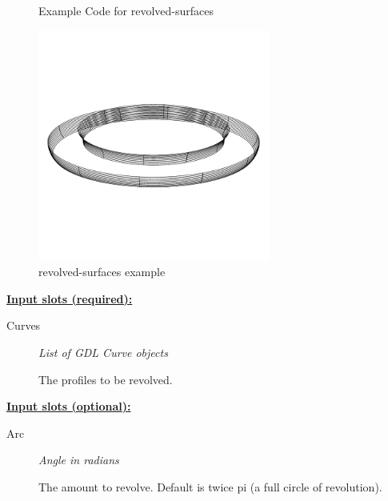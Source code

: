 \documentclass [11pt]{book}
\begin{document}
\begin{itemize}
\begin{figure}
\caption{Example Code for revolved-surfaces}

\label{fig:example-code-revolved-surfaces}

\end{figure}

\begin{figure}
\begin{center}
\includegraphics[width=3in,height=3in]{../images/example-revolved-surfaces.pdf}
\end{center}

\caption{revolved-surfaces example}

\label{fig:revolved-surfaces}

\end{figure}





\textbf{
\underline{Input slots (required):}}

\begin{description}

\item [Curves]
\emph{List of GDL Curve objects}

 The profiles to be revolved.




\end{description}






\textbf{
\underline{Input slots (optional):}}

\begin{description}

\item [Arc]
\emph{Angle in radians}

 The amount to revolve. Default is twice pi (a full circle of revolution).





\end{description}
\end{itemize}
\end{document}
